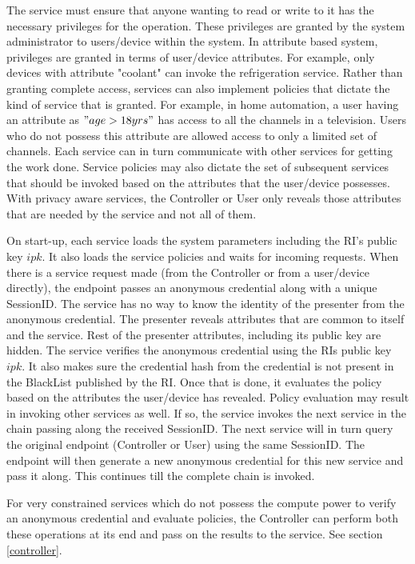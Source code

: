 \documentclass[journal]{IEEEtran}
\begin{document}
The service must ensure that anyone wanting to read or write to it has the necessary privileges for the operation. These privileges are granted by the system administrator to users/device within the system. In attribute based system, privileges are granted in terms of user/device attributes. For example, only devices with attribute "coolant" can invoke the refrigeration service. Rather than granting complete access, services can also implement policies that dictate the kind of service that is granted. For example, in home automation, a user having an attribute as $"age > 18yrs"$ has access to all the channels in a television. Users who do not possess this attribute are allowed access to only a limited set of channels. Each service can in turn communicate with other services for getting the work done. Service policies may also dictate the set of subsequent services that should be invoked based on the attributes that the user/device possesses. With privacy aware services, the Controller or User only reveals those attributes that are needed by the service and not all of them. 

On start-up, each service loads the system parameters including the RI's public key $ipk$. It also loads the service policies and waits for incoming requests. When there is a service request made (from the Controller or from a user/device directly), the endpoint passes an anonymous credential along with a unique SessionID. The service has no way to know the identity of the presenter from the anonymous credential. The presenter reveals  attributes that are common to itself and the service. Rest of the presenter attributes, including its public key are hidden. The service verifies the anonymous credential using the RIs public key $ipk$. It also makes sure the credential hash from the credential is not present in the BlackList published by the RI. Once that is done, it evaluates the policy based on the attributes the user/device has revealed. Policy evaluation may result in invoking other services as well. If so, the service invokes the next service in the chain passing along the received SessionID. The next service will in turn query the original endpoint (Controller or User) using the same SessionID. The endpoint will then generate a new anonymous credential for this new service and pass it along. This continues till the complete chain is invoked.

For very constrained services which do not possess the compute power to verify an anonymous credential and evaluate policies, the Controller can perform both these operations at its end and pass on the results to the service. See section \ref{controller}.
\end{document}
